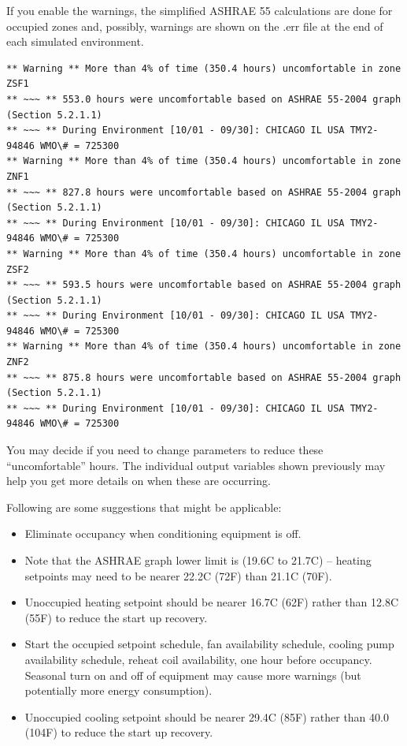 If you enable the warnings, the simplified ASHRAE 55 calculations are done for occupied zones and, possibly, warnings are shown on the .err file at the end of each simulated environment.

\begin{lstlisting}
** Warning ** More than 4% of time (350.4 hours) uncomfortable in zone ZSF1
** ~~~ ** 553.0 hours were uncomfortable based on ASHRAE 55-2004 graph (Section 5.2.1.1)
** ~~~ ** During Environment [10/01 - 09/30]: CHICAGO IL USA TMY2-94846 WMO\# = 725300
** Warning ** More than 4% of time (350.4 hours) uncomfortable in zone ZNF1
** ~~~ ** 827.8 hours were uncomfortable based on ASHRAE 55-2004 graph (Section 5.2.1.1)
** ~~~ ** During Environment [10/01 - 09/30]: CHICAGO IL USA TMY2-94846 WMO\# = 725300
** Warning ** More than 4% of time (350.4 hours) uncomfortable in zone ZSF2
** ~~~ ** 593.5 hours were uncomfortable based on ASHRAE 55-2004 graph (Section 5.2.1.1)
** ~~~ ** During Environment [10/01 - 09/30]: CHICAGO IL USA TMY2-94846 WMO\# = 725300
** Warning ** More than 4% of time (350.4 hours) uncomfortable in zone ZNF2
** ~~~ ** 875.8 hours were uncomfortable based on ASHRAE 55-2004 graph (Section 5.2.1.1)
** ~~~ ** During Environment [10/01 - 09/30]: CHICAGO IL USA TMY2-94846 WMO\# = 725300
\end{lstlisting}

You may decide if you need to change parameters to reduce these ``uncomfortable'' hours. The individual output variables shown previously may help you get more details on when these are occurring.

Following are some suggestions that might be applicable:

\begin{itemize}
\item
  Eliminate occupancy when conditioning equipment is off.
\item
  Note that the ASHRAE graph lower limit is (19.6C to 21.7C) -- heating setpoints may need to be nearer 22.2C (72F) than 21.1C (70F).
\item
  Unoccupied heating setpoint should be nearer 16.7C (62F) rather than 12.8C (55F) to reduce the start up recovery.
\item
  Start the occupied setpoint schedule, fan availability schedule, cooling pump availability schedule, reheat coil availability, one hour before occupancy. Seasonal turn on and off of equipment may cause more warnings (but potentially more energy consumption).
\item
  Unoccupied cooling setpoint should be nearer 29.4C (85F) rather than 40.0 (104F) to reduce the start up recovery.
\end{itemize}


